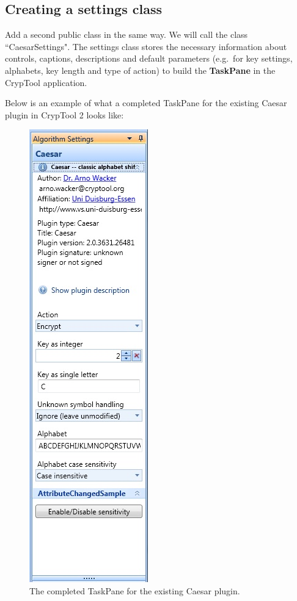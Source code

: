 \subsection{Creating a settings class}
\label{sec:CreatingASettingsClass}

Add a second public class in the same way. We will call the class ``CaesarSettings". The settings class stores the necessary information about controls, captions, descriptions and default parameters (e.g.\ for key settings, alphabets, key length and type of action) to build the \textbf{TaskPane} in the CrypTool application.
\clearpage

\noindent Below is an example of what a completed TaskPane for the existing Caesar plugin in CrypTool 2 looks like:

\begin{figure}[h!]
	\centering
		\includegraphics{figures/task_pane.jpg}
	\caption{The completed TaskPane for the existing Caesar plugin.}
	\label{fig:task_pane}
\end{figure}
\clearpage

